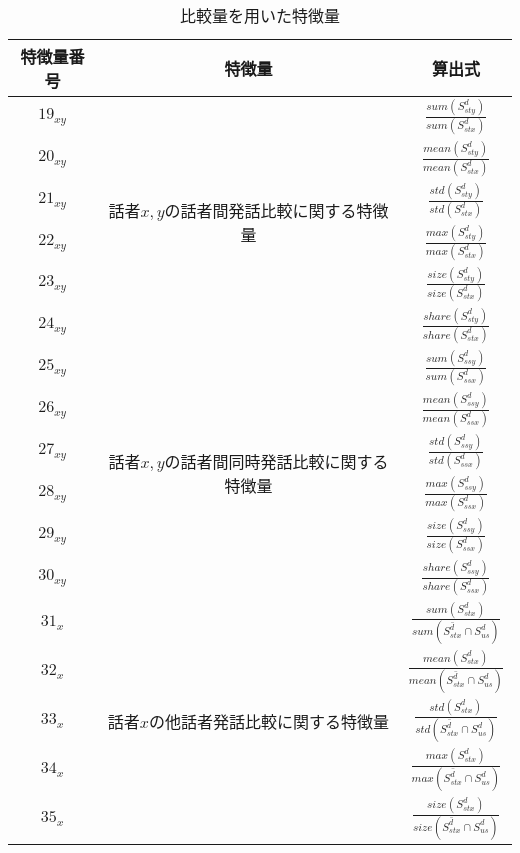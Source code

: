 \begin{table}[htpb]
    \caption{比較量を用いた特徴量}
    \centering
    \begin{tabular}{|c|c|c|}
        \hline
        特徴量番号 & 特徴量 & 算出式 \\ \hline\hline
        $19_{xy}$ & \multirow{6}{*}{話者$x, y$の話者間発話比較に関する特徴量} & $\frac{sum(S^d_{sty})}{sum(S^d_{stx})}$ \\ \cline{1-1}\cline{3-3}
        $20_{xy}$ & & $\frac{mean(S^d_{sty})}{mean(S^d_{stx})}$ \\ \cline{1-1}\cline{3-3}
        $21_{xy}$ & & $\frac{std(S^d_{sty})}{std(S^d_{stx})}$ \\ \cline{1-1}\cline{3-3}
        $22_{xy}$ & & $\frac{max(S^d_{sty})}{max(S^d_{stx})}$ \\ \cline{1-1}\cline{3-3}
        $23_{xy}$ & & $\frac{size(S^d_{sty})}{size(S^d_{stx})}$ \\ \cline{1-1}\cline{3-3}
        $24_{xy}$ & & $\frac{share(S^d_{sty})}{share(S^d_{stx})}$ \\ \hline
        $25_{xy}$ & \multirow{6}{*}{話者$x, y$の話者間同時発話比較に関する特徴量} & $\frac{sum(S^d_{ssy})}{sum(S^d_{ssx})}$ \\ \cline{1-1}\cline{3-3}
        $26_{xy}$ & & $\frac{mean(S^d_{ssy})}{mean(S^d_{ssx})}$ \\ \cline{1-1}\cline{3-3}
        $27_{xy}$ & & $\frac{std(S^d_{ssy})}{std(S^d_{ssx})}$ \\ \cline{1-1}\cline{3-3}
        $28_{xy}$ & & $\frac{max(S^d_{ssy})}{max(S^d_{ssx})}$ \\ \cline{1-1}\cline{3-3}
        $29_{xy}$ & & $\frac{size(S^d_{ssy})}{size(S^d_{ssx})}$ \\ \cline{1-1}\cline{3-3}
        $30_{xy}$ & & $\frac{share(S^d_{ssy})}{share(S^d_{ssx})}$ \\ \hline
        $31_{x}$ & \multirow{6}{*}{話者$x$の他話者発話比較に関する特徴量} & $\frac{sum(S^d_{stx})}{sum(\overline{S^d_{stx}} \cap S^d_{us})}$ \\ \cline{1-1}\cline{3-3}
        $32_{x}$ & & $\frac{mean(S^d_{stx})}{mean(\overline{S^d_{stx}} \cap S^d_{us})}$ \\ \cline{1-1}\cline{3-3}
        $33_{x}$ & & $\frac{std(S^d_{stx})}{std(\overline{S^d_{stx}} \cap S^d_{us})}$ \\ \cline{1-1}\cline{3-3}
        $34_{x}$ & & $\frac{max(S^d_{stx})}{max(\overline{S^d_{stx}} \cap S^d_{us})}$ \\ \cline{1-1}\cline{3-3}
        $35_{x}$ & & $\frac{size(S^d_{stx})}{size(\overline{S^d_{stx}} \cap S^d_{us})}$ \\ \cline{1-1}\cline{3-3}

\end{tabular}
\end{table}
